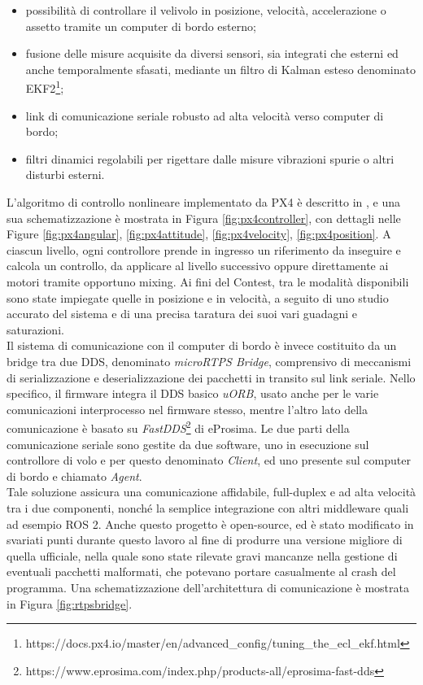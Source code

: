 \begin{itemize}
    \item possibilità di controllare il velivolo in posizione, velocità, accelerazione o assetto tramite un computer di bordo esterno;
    \item fusione delle misure acquisite da diversi sensori, sia integrati che esterni ed anche temporalmente sfasati, mediante un filtro di Kalman esteso denominato EKF2\footnote{https://docs.px4.io/master/en/advanced\_config/tuning\_the\_ecl\_ekf.html};
    \item link di comunicazione seriale robusto ad alta velocità verso computer di bordo;
    \item filtri dinamici regolabili per rigettare dalle misure vibrazioni spurie o altri disturbi esterni.
\end{itemize}
\vfill\newpage
L'algoritmo di controllo nonlineare implementato da PX4 è descritto in \cite{px4control}, e una sua schematizzazione è mostrata in Figura \ref{fig:px4controller}, con dettagli nelle Figure \ref{fig:px4angular}, \ref{fig:px4attitude}, \ref{fig:px4velocity}, \ref{fig:px4position}. A ciascun livello, ogni controllore prende in ingresso un riferimento da inseguire e calcola un controllo, da applicare al livello successivo oppure direttamente ai motori tramite opportuno mixing. Ai fini del Contest, tra le modalità disponibili sono state impiegate quelle in posizione e in velocità, a seguito di uno studio accurato del sistema e di una precisa taratura dei suoi vari guadagni e saturazioni.\\
Il sistema di comunicazione con il computer di bordo è invece costituito da un bridge tra due DDS, denominato \emph{microRTPS Bridge}, comprensivo di meccanismi di serializzazione e deserializzazione dei pacchetti in transito sul link seriale. Nello specifico, il firmware integra il DDS basico \emph{uORB}, usato anche per le varie comunicazioni interprocesso nel firmware stesso, mentre l'altro lato della comunicazione è basato su \emph{FastDDS}\footnote{https://www.eprosima.com/index.php/products-all/eprosima-fast-dds} di eProsima. Le due parti della comunicazione seriale sono gestite da due software, uno in esecuzione sul controllore di volo e per questo denominato \emph{Client}, ed uno presente sul computer di bordo e chiamato \emph{Agent}.\\
Tale soluzione assicura una comunicazione affidabile, full-duplex e ad alta velocità tra i due componenti, nonché la semplice integrazione con altri middleware quali ad esempio ROS 2. Anche questo progetto è open-source, ed è stato modificato in svariati punti durante questo lavoro al fine di produrre una versione migliore di quella ufficiale, nella quale sono state rilevate gravi mancanze nella gestione di eventuali pacchetti malformati, che potevano portare casualmente al crash del programma. Una schematizzazione dell'architettura di comunicazione è mostrata in Figura \ref{fig:rtpsbridge}.
\vfill\newpage

